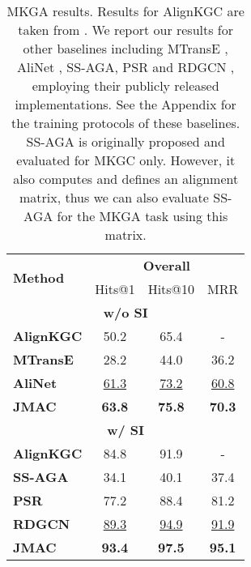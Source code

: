 \documentclass[11pt]{article}
\begin{document}
\begin{table}[!t]
\centering
    \setlength{\tabcolsep}{0.4em}
    \def\arraystretch{1.1}
    \begin{tabular}{l|c|c|c}
    \hline
    \multirow{2}{*}{\bf Method} & 
    \multicolumn{3}{c}{\bf Overall} \\
    \cline{2-4}
    & Hits@1 & Hits@10 & MRR \\
    \hline
    \multicolumn{4}{c}{\textbf{w/o SI}} \\
    \hline
    \textbf{AlignKGC} & 50.2 & 65.4 & - \\
    \bf MTransE &  28.2 & 44.0 & 36.2 \\
    \bf AliNet & \underline{61.3} & \underline{73.2} & \underline{60.8} \\
    \textbf{JMAC} & \bf {63.8} & \bf 75.8 & \bf 70.3 \\
\hline
    \multicolumn{4}{c}{\textbf{w/ SI}} \\
    \hline
    \textbf{AlignKGC}  & 84.8 & 91.9 & - \\
    \bf SS-AGA & 34.1 & 40.1 & 37.4 \\
    \bf PSR & 77.2 & 88.4 & 81.2 \\
    \bf RDGCN & \underline{89.3} & \underline{94.9} & \underline{91.9} \\
    \textbf{JMAC}  & \bf 93.4 & \bf 97.5 & \bf 95.1 \\
    \hline 
\end{tabular}
   
\caption{MKGA results. Results for AlignKGC are taken from . We report our results for other baselines including {MTransE} \cite{MTransE}, {AliNet} \cite{sun2020knowledge}, {SS-AGA}, PSR \cite{Mao2021PSR} and  {RDGCN} \cite{wu2019relation}, employing their publicly released implementations. See the Appendix for the training protocols of these baselines. SS-AGA is originally proposed and evaluated for MKGC only. However, it also computes and defines an alignment matrix, thus we can also evaluate SS-AGA for the MKGA task using this matrix. 
    }
    \label{tab:end2end_kga2}
\end{table}
\end{document}
